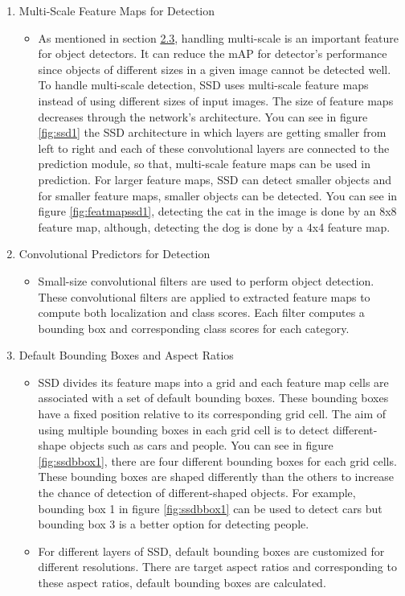 \documentclass{article}
\begin{document}
\begin{enumerate}
    \item Multi-Scale Feature Maps for Detection
    \begin{itemize}
        \item As mentioned in section \hyperref[sec:multscale]{2.3}, handling multi-scale is an important feature 
for object detectors. It can reduce the mAP for detector's performance since objects 
of different sizes in a given image cannot be detected well. To handle multi-scale detection, 
SSD uses multi-scale feature maps instead of using different sizes of input images. 
The size of feature maps decreases through the network's architecture. You can see in figure 
\ref{fig:ssd1} the SSD architecture in which layers are getting smaller from left to right and 
each of these convolutional layers are connected to the prediction module, so that, multi-scale 
feature maps can be used in prediction. For larger feature maps, SSD can detect smaller objects 
and for smaller feature maps, smaller objects can be detected. You can see in figure 
\ref{fig:featmapssd1}, detecting the cat in the image is done by an 8x8 feature map, although, detecting 
the dog is done by a 4x4 feature map.
    \end{itemize}
    \item Convolutional Predictors for Detection
    \begin{itemize}
        \item Small-size convolutional filters are used to perform object detection. 
        These convolutional filters are applied to extracted feature maps to compute 
        both localization and class scores. Each filter computes a bounding box and 
        corresponding class scores for each category.
    \end{itemize}
    \item Default Bounding Boxes and Aspect Ratios
    \begin{itemize}
        \item SSD divides its feature maps into a grid and each feature map cells are 
associated with a set of default bounding boxes. These bounding boxes have a fixed position 
relative to its corresponding grid cell. The aim of using multiple bounding boxes 
in each grid cell is to detect different-shape objects such as cars and people. You can see in 
figure \ref{fig:ssdbbox1}, there are four different bounding boxes for each grid cells. These bounding 
boxes are shaped differently than the others to increase the chance of detection of different-shaped 
objects. For example, bounding box 1 in figure \ref{fig:ssdbbox1} can be used to detect cars but 
bounding box 3 is a better option for detecting people.
        \item For different layers of SSD, default bounding boxes are customized for 
different resolutions. There are target aspect ratios and corresponding to these 
aspect ratios, default bounding boxes are calculated.
    \end{itemize}
\end{enumerate}
\end{document}
